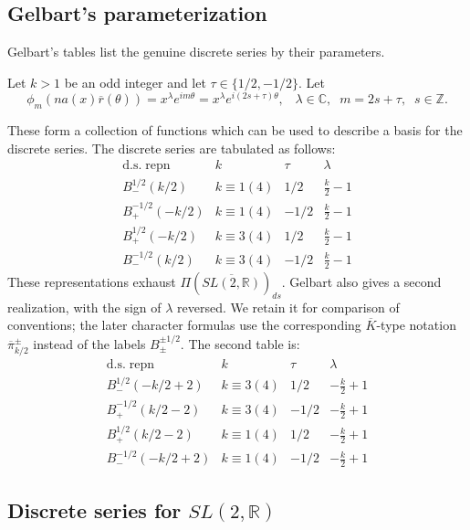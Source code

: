 \documentclass[12pt,letterpaper,openany]{book}
\theoremstyle{plain}
\theoremstyle{definition}
\theoremstyle{remark}
\theoremstyle{remark}
\begin{document}
\subsection{\texorpdfstring{Gelbart's parameterization \cite[p.~75]{Ge2}}{Gelbart's parameterization}}

Gelbart's tables list the genuine discrete series by their parameters.


Let $k>1$ be an odd integer and let $\tau \in \{1/2,-1/2\}$. Let
\[
\phi _m(na(x)\overline{r}(\theta ))=x^\lambda e^{im\theta }=x^\lambda
e^{i(2s+\tau )\theta },\;\;\;\lambda \in \mathbb{C},\;\;m=2s+\tau ,\;\;s\in
\mathbb{Z}.
\]

These form a collection of functions which can be used to describe a basis
for the discrete series. The discrete series are tabulated as follows:
\[
\begin{array}{cccc}
\mathrm{d.s.\;repn} & k & \tau & \lambda \\
B_{-}^{1/2}(k/2) & k\equiv 1(4) & 1/2 & \frac k2-1 \\
B_{+}^{-1/2}(-k/2) & k\equiv 1(4) & -1/2 & \frac k2-1 \\
B_{+}^{1/2}(-k/2) & k\equiv 3(4) & 1/2 & \frac k2-1 \\
B_{-}^{-1/2}(k/2) & k\equiv 3(4) & -1/2 & \frac k2-1
\end{array}
\]
These representations exhaust $\Pi (\overline{SL(2,\mathbb{R})})_{ds}$.
Gelbart also gives a second realization, with the sign of
$\lambda$ reversed. We retain it for comparison of conventions;
the later character formulas use the corresponding
$\overline K$-type notation $\overline\pi_{k/2}^{\pm}$ instead
of the labels $B_{\pm}^{\pm1/2}$. The second table is:
\[
\begin{array}{cccc}
\mathrm{d.s.\;repn} & k & \tau & \lambda \\
B_{-}^{1/2}(-k/2+2) & k\equiv 3(4) & 1/2 & -\frac k2+1 \\
B_{+}^{-1/2}(k/2-2) & k\equiv 3(4) & -1/2 & -\frac k2+1 \\
B_{+}^{1/2}(k/2-2) & k\equiv 1(4) & 1/2 & -\frac k2+1 \\
B_{-}^{-1/2}(-k/2+2) & k\equiv 1(4) & -1/2 & -\frac k2+1
\end{array}
\]

\subsection{Discrete series for \texorpdfstring{$SL(2,\mathbb{R})$}{SL(2,R)}}
\end{document}
